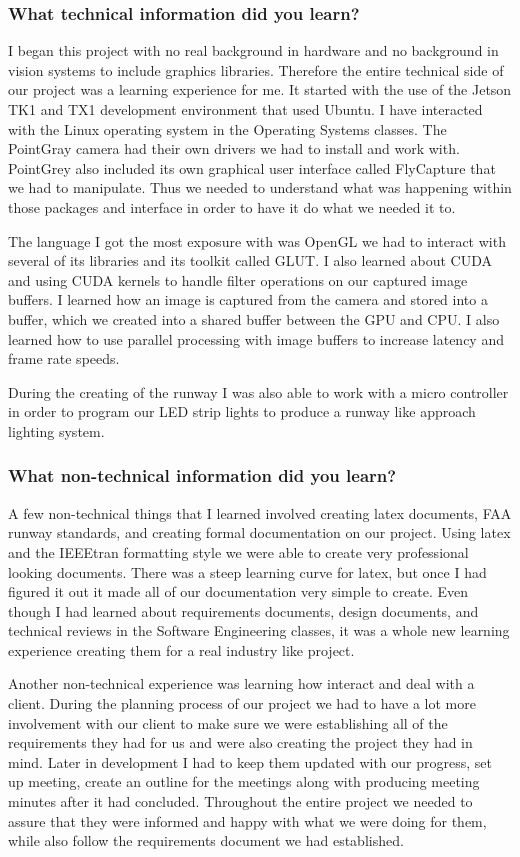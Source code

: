\subsubsection{What technical information did you learn?}
I began this project with no real background in hardware and no background in vision systems to include graphics libraries. Therefore the entire technical side of our project was a learning experience for me. It started with the use of the Jetson TK1 and TX1 development environment that used Ubuntu. I have interacted with the Linux operating system in the Operating Systems classes. The PointGray camera had their own drivers we had to install and work with. PointGrey also included its own graphical user interface called FlyCapture that we had to manipulate. Thus we needed to understand what was happening within those packages and interface in order to have it do what we needed it to. 
\par
The language I got the most exposure with was OpenGL we had to interact with several of its libraries and its toolkit called GLUT. I also learned about CUDA and using CUDA kernels to handle filter operations on our captured image buffers. I learned how an image is captured from the camera and stored into a buffer, which we created into a shared buffer between the GPU and CPU. I also learned how to use parallel processing with image buffers to increase latency and frame rate speeds. 
\par
During the creating of the runway I was also able to work with a micro controller in order to program our LED strip lights to produce a runway like approach lighting system.\\

\subsubsection{What non-technical information did you learn?}
A few non-technical things that I learned involved creating latex documents, FAA runway standards, and creating formal documentation on our project. Using latex and the IEEEtran formatting style we were able to create very professional looking documents. There was a steep learning curve for latex, but once I had figured it out it made all of our documentation very simple to create. Even though I had learned about requirements documents, design documents, and technical reviews in the Software Engineering classes, it was a whole new learning experience creating them for a real industry like project. 
\par
Another non-technical experience was learning how interact and deal with a client. During the planning process of our project we had to have a lot more involvement with our client to make sure we were establishing all of the requirements they had for us and were also creating the project they had in mind. Later in development I had to keep them updated with our progress, set up meeting, create an outline for the meetings along with producing meeting minutes after it had concluded. Throughout the entire project we needed to assure that they were informed and happy with what we were doing for them, while also follow the requirements document we had established.\\

